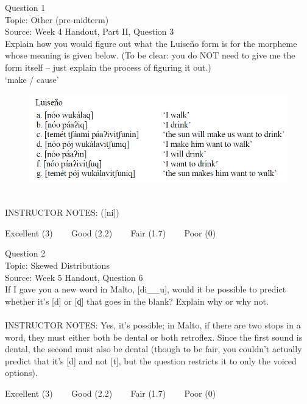 \documentclass[12pt]{article}
\begin{document}
{\large Question 1}\\

Topic: Other (pre-midterm)\\
Source: Week 4 Handout, Part II, Question 3\\

Explain how you would figure out what the Luiseño form is for the morpheme whose meaning is given below. (To be clear: you do NOT need to give me the form itself -- just explain the process of figuring it out.)\\

‘make / cause’

\begin{figure}[H]
\includegraphics{../images/luiseno.png}
\end{figure}

~\\
INSTRUCTOR NOTES: ([ni])


\vfill
Excellent (3) ~~~ Good (2.2) ~~~ Fair (1.7) ~~~ Poor (0)
\newpage

{\large Question 2}\\

Topic: Skewed Distributions\\
Source: Week 5 Handout, Question 6\\

If I gave you a new word in Malto, [di\_\_u], would it be possible to predict whether it's [d] or [ɖ] that goes in the blank? Explain why or why not.\\


~\\
INSTRUCTOR NOTES: Yes, it's possible; in Malto, if there are two stops in a word, they must either both be dental or both retroflex. Since the first sound is dental, the second must also be dental (though to be fair, you couldn't actually predict that it's [d] and not [t], but the question restricts it to only the voiced options).


\vfill
Excellent (3) ~~~ Good (2.2) ~~~ Fair (1.7) ~~~ Poor (0)
\newpage

\begin{center}
\textbf{{\color{red}{\HUGE END OF EXAM}}}\\

\end{center}
\newpage
\end{document}
